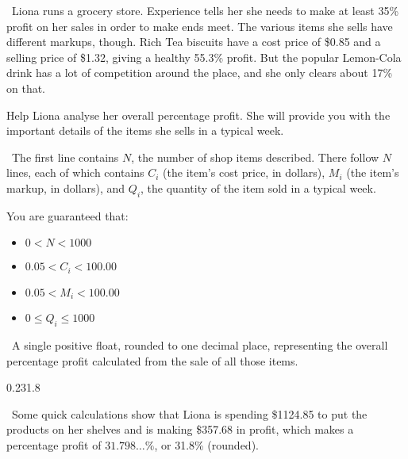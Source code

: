 

\Question\ Liona runs a grocery store. Experience tells her she needs to make at least
35\% profit on her sales in order to make ends meet. The various items she sells have
different markups, though. Rich Tea biscuits have a cost price of \$0.85 and a selling
price of \$1.32, giving a healthy 55.3\% profit. But the popular Lemon-Cola drink has a
lot of competition around the place, and she only clears about 17\% on that.

Help Liona analyse her overall percentage profit. She will provide you with the important
details of the items she sells in a typical week.

\Input\ The first line contains $N$, the number of shop items described. There follow $N$
lines, each of which contains $C_i$ (the item's cost price, in dollars), $M_i$ (the item's
markup, in dollars), and $Q_i$, the quantity of the item sold in a typical week.

You are guaranteed that:
\begin{itemize}
  \item $0 < N < 1000$
  \item $0.05 < C_i < 100.00$
  \item $0.05 < M_i < 100.00$
  \item $0 \le Q_i \le 1000$
\end{itemize}

\Output\ A single positive float, rounded to one decimal place, representing the overall
percentage profit calculated from the sale of all those items.

\Sample

       {0.2}{31.8}

\Explanation\ Some quick calculations show that Liona is spending \$1124.85 to put the
products on her shelves and is making \$357.68 in profit, which makes a percentage profit
of $31.798\dots\%$, or 31.8\% (rounded).
